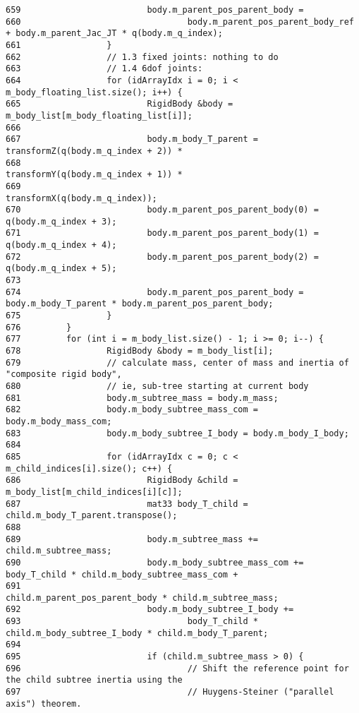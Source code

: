 \begin{Code}
\begin{verbatim}
659                         body.m_parent_pos_parent_body =
660                                 body.m_parent_pos_parent_body_ref + body.m_parent_Jac_JT * q(body.m_q_index);
661                 }
662                 // 1.3 fixed joints: nothing to do
663                 // 1.4 6dof joints:
664                 for (idArrayIdx i = 0; i < m_body_floating_list.size(); i++) {
665                         RigidBody &body = m_body_list[m_body_floating_list[i]];
666 
667                         body.m_body_T_parent = transformZ(q(body.m_q_index + 2)) *
668                                                                    transformY(q(body.m_q_index + 1)) *
669                                                                    transformX(q(body.m_q_index));
670                         body.m_parent_pos_parent_body(0) = q(body.m_q_index + 3);
671                         body.m_parent_pos_parent_body(1) = q(body.m_q_index + 4);
672                         body.m_parent_pos_parent_body(2) = q(body.m_q_index + 5);
673 
674                         body.m_parent_pos_parent_body = body.m_body_T_parent * body.m_parent_pos_parent_body;
675                 }
676         }
677         for (int i = m_body_list.size() - 1; i >= 0; i--) {
678                 RigidBody &body = m_body_list[i];
679                 // calculate mass, center of mass and inertia of "composite rigid body",
680                 // ie, sub-tree starting at current body
681                 body.m_subtree_mass = body.m_mass;
682                 body.m_body_subtree_mass_com = body.m_body_mass_com;
683                 body.m_body_subtree_I_body = body.m_body_I_body;
684 
685                 for (idArrayIdx c = 0; c < m_child_indices[i].size(); c++) {
686                         RigidBody &child = m_body_list[m_child_indices[i][c]];
687                         mat33 body_T_child = child.m_body_T_parent.transpose();
688 
689                         body.m_subtree_mass += child.m_subtree_mass;
690                         body.m_body_subtree_mass_com += body_T_child * child.m_body_subtree_mass_com +
691                                                                                         child.m_parent_pos_parent_body * child.m_subtree_mass;
692                         body.m_body_subtree_I_body +=
693                                 body_T_child * child.m_body_subtree_I_body * child.m_body_T_parent;
694 
695                         if (child.m_subtree_mass > 0) {
696                                 // Shift the reference point for the child subtree inertia using the
697                                 // Huygens-Steiner ("parallel axis") theorem.

\end{verbatim}
\end{Code}

